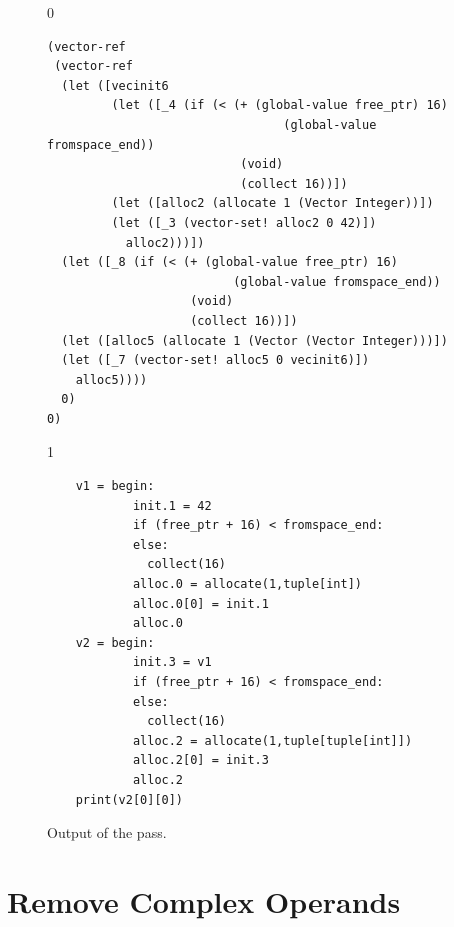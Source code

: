 \documentclass[7x10]{TimesAPriori_MIT}%
\def\racketEd{0}
\def\pythonEd{1}
\providecommand{\BookEdition}{1}
\let\edition\BookEdition
\newcommand{\pythonColor}[0]{}
\numberwithin{theorem}{chapter}
\numberwithin{definition}{chapter}
\numberwithin{equation}{chapter}
\begin{document}
\begin{figure}[tbp]
  \begin{tcolorbox}[colback=white]
{\if\edition\racketEd
\begin{lstlisting}
(vector-ref
 (vector-ref
  (let ([vecinit6
         (let ([_4 (if (< (+ (global-value free_ptr) 16)
                                 (global-value fromspace_end))
                           (void)
                           (collect 16))])
         (let ([alloc2 (allocate 1 (Vector Integer))])
         (let ([_3 (vector-set! alloc2 0 42)])
           alloc2)))])
  (let ([_8 (if (< (+ (global-value free_ptr) 16)
                          (global-value fromspace_end))
                    (void)
                    (collect 16))])
  (let ([alloc5 (allocate 1 (Vector (Vector Integer)))])
  (let ([_7 (vector-set! alloc5 0 vecinit6)])
    alloc5))))
  0)
0)
\end{lstlisting}
\fi}
{\if\edition\pythonEd\pythonColor
\begin{lstlisting}
    v1 = begin:
            init.1 = 42
            if (free_ptr + 16) < fromspace_end:
            else:
              collect(16)
            alloc.0 = allocate(1,tuple[int])
            alloc.0[0] = init.1
            alloc.0
    v2 = begin:
            init.3 = v1
            if (free_ptr + 16) < fromspace_end:
            else:
              collect(16)
            alloc.2 = allocate(1,tuple[tuple[int]])
            alloc.2[0] = init.3
            alloc.2
    print(v2[0][0])
\end{lstlisting}
\fi}
  \end{tcolorbox}
\caption{Output of the  pass.}
\label{fig:expose-alloc-output}
\end{figure}


\section{Remove Complex Operands}
\label{sec:remove-complex-opera-Lvec}
\end{document}
